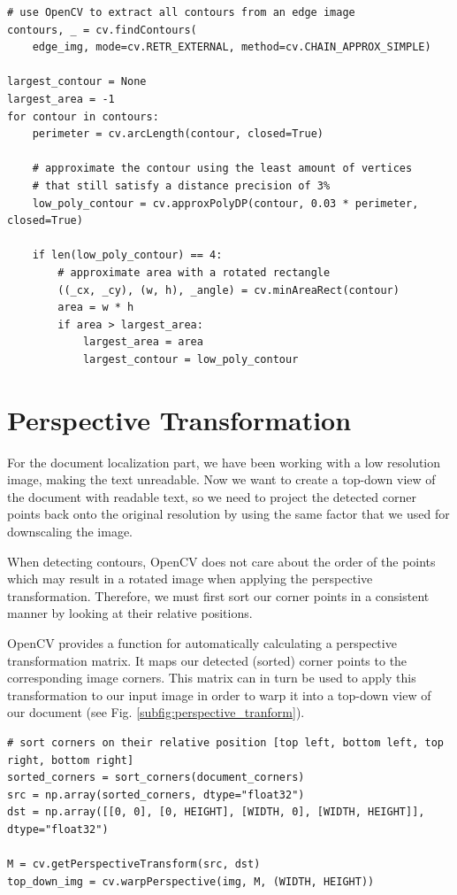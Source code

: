 \documentclass[bibliography=totoc]{scrartcl}
\begin{document}
\lstset{language=Python}
\lstset{frame=lines}
\lstset{basicstyle=\footnotesize}
\begin{lstlisting}
# use OpenCV to extract all contours from an edge image
contours, _ = cv.findContours(
	edge_img, mode=cv.RETR_EXTERNAL, method=cv.CHAIN_APPROX_SIMPLE)

largest_contour = None
largest_area = -1
for contour in contours:
	perimeter = cv.arcLength(contour, closed=True)
	
	# approximate the contour using the least amount of vertices 
	# that still satisfy a distance precision of 3%
	low_poly_contour = cv.approxPolyDP(contour, 0.03 * perimeter, closed=True)

	if len(low_poly_contour) == 4:
		# approximate area with a rotated rectangle
		((_cx, _cy), (w, h), _angle) = cv.minAreaRect(contour)
		area = w * h
		if area > largest_area:
			largest_area = area
			largest_contour = low_poly_contour
	\end{lstlisting}


\section{Perspective Transformation}
For the document localization part, we have been working with a low resolution image, making the text unreadable.
Now we want to create a top-down view of the document with readable text, so we need to project the detected corner points back onto the original resolution by using the same factor that we used for downscaling the image.

When detecting contours, OpenCV does not care about the order of the points which may result in a rotated image when applying the perspective transformation.
Therefore, we must first sort our corner points in a consistent manner by looking at their relative positions.

OpenCV provides a function for automatically calculating a perspective transformation matrix.
It maps our detected (sorted) corner points to the corresponding image corners.
This matrix can in turn be used to apply this transformation to our input image in order to warp it into a top-down view of our document (see Fig. \ref{subfig:perspective_tranform}).\\

\lstset{language=Python}
\lstset{frame=lines}
\lstset{basicstyle=\footnotesize}
\begin{lstlisting}
# sort corners on their relative position [top left, bottom left, top right, bottom right]
sorted_corners = sort_corners(document_corners)
src = np.array(sorted_corners, dtype="float32")
dst = np.array([[0, 0], [0, HEIGHT], [WIDTH, 0], [WIDTH, HEIGHT]], dtype="float32")

M = cv.getPerspectiveTransform(src, dst)
top_down_img = cv.warpPerspective(img, M, (WIDTH, HEIGHT))
	\end{lstlisting}
\end{document}

